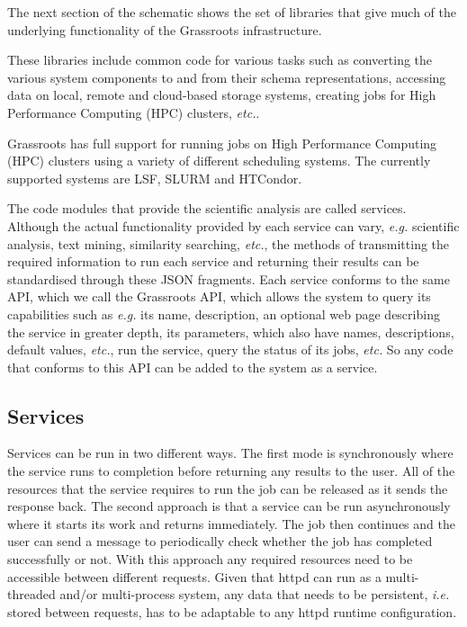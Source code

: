 \documentclass[12pt,a4paper]{extarticle}
\begin{document}
The next section of the schematic shows the set of libraries that give much of the underlying functionality of the Grassroots infrastructure. 

These libraries include common code for various tasks such as converting the various system components to and from their schema representations, accessing data on local, remote and cloud-based storage systems, creating jobs for High Performance Computing (HPC) clusters, \textit{etc.}. 

Grassroots has full support for running jobs on High Performance Computing (HPC) clusters using a variety of different scheduling systems. The currently supported systems are LSF\cite{lsf}, SLURM\cite{yoo2003slurm} and HTCondor\cite{htcondor}.

The code modules that provide the scientific analysis are called services.
Although the actual functionality provided by each service can vary, \textit{e.g.} scientific analysis, text mining, similarity searching, \textit{etc.}, the methods of transmitting the required information to run each service and returning their results can be standardised through these JSON fragments. 
Each service conforms to the same API, which we call the Grassroots API, which allows the system to query its capabilities such as \textit{e.g.} its name, description, an optional web page describing the service in greater depth, its parameters, which also have names, descriptions, default values, \textit{etc.}, run the service, query the status of its jobs, \textit{etc.} 
So any code that conforms to this API can be added to the system as a service.


\subsection*{Services}

Services can be run in two different ways. 
The first mode is synchronously where the service runs to completion before returning any results to the user. 
All of the resources that the service requires to run the job can be released as it sends the response back.
The second approach is that a service can be run asynchronously where it starts its work and returns immediately. 
The job then continues and the user can send a message to periodically check whether the job has completed successfully or not. 
With this approach any required resources need to be accessible between different requests. 
Given that httpd can run as a multi-threaded and/or multi-process system, any data that needs to be persistent, \textit{i.e.} stored between requests, has to be adaptable to any httpd runtime configuration.
\end{document}

